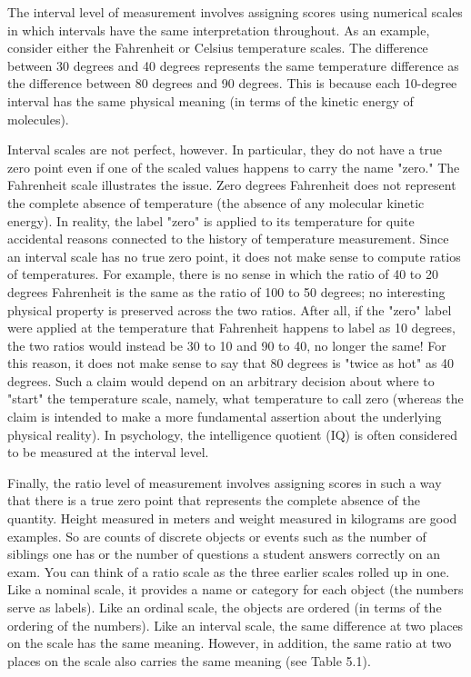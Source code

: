 The interval level of measurement involves assigning scores using numerical scales in which intervals have the same interpretation throughout. As an example, consider either the Fahrenheit or Celsius temperature scales. The difference between 30 degrees and 40 degrees represents the same temperature difference as the difference between 80 degrees and 90 degrees. This is because each 10-degree interval has the same physical meaning (in terms of the kinetic energy of molecules).

Interval scales are not perfect, however. In particular, they do not have a true zero point even if one of the scaled values happens to carry the name "zero." The Fahrenheit scale illustrates the issue. Zero degrees Fahrenheit does not represent the complete absence of temperature (the absence of any molecular kinetic energy). In reality, the label "zero" is applied to its temperature for quite accidental reasons connected to the history of temperature measurement. Since an interval scale has no true zero point, it does not make sense to compute ratios of temperatures. For example, there is no sense in which the ratio of 40 to 20 degrees Fahrenheit is the same as the ratio of 100 to 50 degrees; no interesting physical property is preserved across the two ratios. After all, if the "zero" label were applied at the temperature that Fahrenheit happens to label as 10 degrees, the two ratios would instead be 30 to 10 and 90 to 40, no longer the same! For this reason, it does not make sense to say that 80 degrees is "twice as hot" as 40 degrees. Such a claim would depend on an arbitrary decision about where to "start" the temperature scale, namely, what temperature to call zero (whereas the claim is intended to make a more fundamental assertion about the underlying physical reality). In psychology, the intelligence quotient (IQ) is often considered to be measured at the interval level.

Finally, the ratio level of measurement involves assigning scores in such a way that there is a true zero point that represents the complete absence of the quantity. Height measured in meters and weight measured in kilograms are good examples. So are counts of discrete objects or events such as the number of siblings one has or the number of questions a student answers correctly on an exam. You can think of a ratio scale as the three earlier scales rolled up in one. Like a nominal scale, it provides a name or category for each object (the numbers serve as labels). Like an ordinal scale, the objects are ordered (in terms of the ordering of the numbers). Like an interval scale, the same difference at two places on the scale has the same meaning. However, in addition, the same ratio at two places on the scale also carries the same meaning (see Table 5.1).

